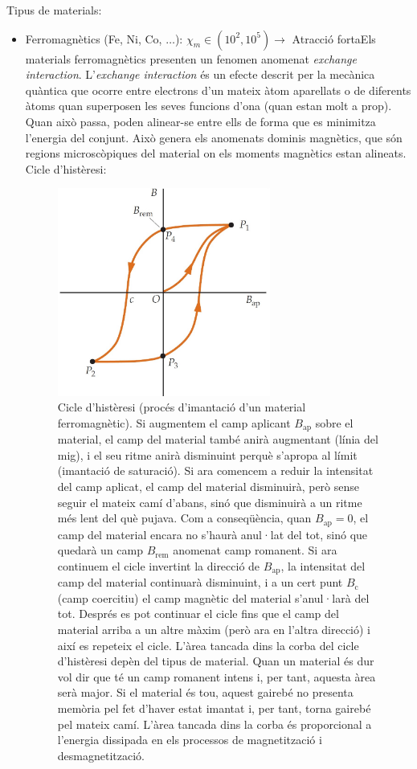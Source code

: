 \documentclass[class=article,10pt,crop=false]{standalone}
\begin{document}
\begin{multicols}{2}
Tipus de materials:
\begin{itemize}
    \item Ferromagnètics (Fe, Ni, Co, $\ldots$): $\chi_m\in(10^2,10^5)\rightarrow$ Atracció forta\newline Els materials ferromagnètics presenten un fenomen anomenat \textit{exchange interaction}. L'\textit{exchange interaction} és un efecte descrit per la mecànica quàntica que ocorre entre electrons d’un mateix àtom aparellats o de diferents àtoms quan superposen les seves funcions d’ona (quan estan molt a prop). Quan això passa, poden alinear-se entre ells de forma que es minimitza l’energia del conjunt. Això genera els anomenats dominis magnètics, que són regions microscòpiques del material on els moments magnètics estan alineats.\newline
    Cicle d'histèresi:\newline
    \begin{figure}[ht]
        \centering
        \includegraphics[width=7cm]{Physics/1st/Electricitat_i_magnetisme/Imatges/hist.jpg}
        \caption{Cicle d'histèresi (procés d'i\-man\-ta\-ció d'un material ferromagnètic). Si augmentem el camp aplicant $B_\text{ap}$ sobre el material, el camp del material també anirà augmentant (línia del mig), i el seu ritme anirà disminuint perquè s’apropa al límit (imantació de saturació). Si ara comencem a reduir la intensitat del camp aplicat, el camp del material disminuirà, però sense seguir el mateix camí d’abans, sinó que disminuirà a un ritme més lent del què pujava. Com a conseqüència, quan $B_\text{ap}=0$, el camp del material encara no s’haurà anul·lat del tot, sinó que quedarà un camp $B_\text{rem}$ anomenat camp romanent. Si ara continuem el cicle invertint la direcció de $B_\text{ap}$, la intensitat del camp del material continuarà disminuint, i a un cert punt $B_\text{c}$ (camp coercitiu) el camp magnètic del material s’anul·larà del tot. Des\-prés es pot continuar el cicle fins que el camp del material arriba a un altre màxim (però ara en l’altra direcció) i així es repeteix el cicle. L'àrea tancada dins la corba del cicle d'histèresi depèn del tipus de material. Quan un material és dur vol dir que té un camp romanent intens i, per tant, aquesta àrea serà major. Si el material és tou, aquest gairebé no presenta memòria pel fet d’haver estat imantat i, per tant, torna gairebé pel mateix camí. L'àrea tancada dins la corba és proporcional a l'energia dissipada en els processos de magnetització i desmagnetització.}

\end{figure}
\end{itemize}
\end{multicols}
\end{document}
